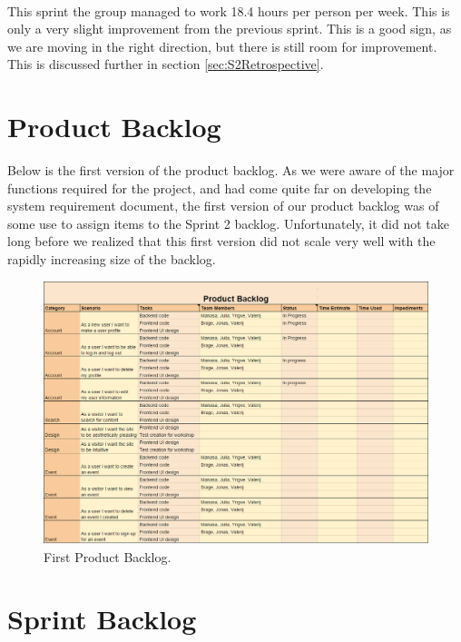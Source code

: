 \bigskip 

\paragraph{} This sprint the group managed to work 18.4 hours per person per week. This is only a very slight improvement from the previous sprint. This is a good sign, as we are moving in the right direction, but there is still room for improvement. This is discussed further in section \ref{sec:S2Retrospective}.

\section{Product Backlog}
\label{sec:S2Backlog}
Below is the first version of the product backlog. As we were aware of the major functions required for the project, and had come quite far on developing the system requirement document, the first version of our product backlog was of some use to assign items to the Sprint 2 backlog. Unfortunately, it did not take long before we realized that this first version did not scale very well with the rapidly increasing size of the backlog. 

\begin{figure}[ht!]
\centering
\includegraphics[width={\linewidth}]{Sprint2/img/Sprint2-FirstProductBacklog.png}
\caption{First Product Backlog. \label{fig:S2BacklogFirst}}
\end{figure}

\section{Sprint Backlog}

